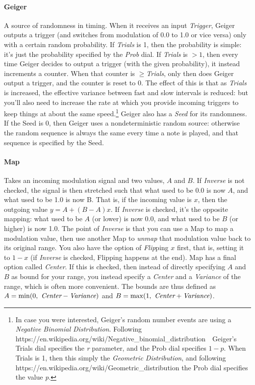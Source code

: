 \documentclass{article}
\begin{document}
\paragraph{Geiger}  A source of randomness in timing.  When it receives an input {\it Trigger}, Geiger outputs a trigger (and switches from modulation of 0.0 to 1.0 or vice versa) only with a certain random probability.  If {\it Trials} is 1, then the probability is simple: it's just the probability specified by the {\it Prob} dial.  If {\it Trials} is \(>1\), then every time Geiger decides to output a trigger (with the given probability), it instead increments a counter.  When that counter is  \(\geq\){\it Trials}, only then does Geiger output a trigger, and the counter is reset to 0.  The effect of this is that as {\it Trials} is increased, the effective variance between fast and slow intervals is reduced: but you'll also need to increase the rate at which you provide incoming triggers to keep things at about the same speed.\footnote{In case you were interested, Geiger's random number events are using a {\it Negative Binomial Distribution}.  Following https:/\!/en.wikipedia.org/wiki/Negative\_binomial\_distribution\ \ Geiger's Trials dial specifies the {\it r} parameter, and the Prob dial specifies \(1-p\).  When Trials is 1, then this simply the {\it Geometric Distribution}, and following https:/\!/en.wikipedia.org/wiki/Geometric\_distribution the Prob dial specifies the value {\it p}.}  Geiger also has a {\it Seed} for its randomness.  If the Seed is 0, then Geiger uses a nondeterministic random source: otherwise the random sequence is always the same every time a note is played, and that sequence is specified by the Seed.

\paragraph{Map}  Takes an incoming modulation signal and two values, \(A\) and \(B\).  If {\it Inverse} is not checked, the signal is then stretched such that what used to be 0.0 is now \(A\), and what used to be 1.0 is now B.  That is, if the incoming value is \(x\), then the outgoing value \(y = A + (B - A)x\).  If {\it Inverse} is checked, it's the opposite mapping: what used to be \(A\) (or lower) is now 0.0, and what used to be \(B\) (or higher) is now 1.0.  The point of {\it Inverse} is that you can use a Map to map a modulation value, then use another Map to {\it unmap} that modulation value back to its original range.  You also have the option of {\it Flip}ping \(x\) first, that is, setting it to \(1-x\) (if {\it Inverse} is checked, Flipping happens at the end).  Map has a final option called {\it Center}.  If this is checked, then instead of directly specifying \(A\) and \(B\) as bound for your range, you instead specify a {\it Center} and a {\it Variance} of the range, which is often more convenient.  The bounds are thus defined as \(A = \min(0,\ \text{\it Center} - \text{\it Variance})\) and \(B = \max(1,\ \text{\it Center} + \text{\it Variance})\).
\end{document}
